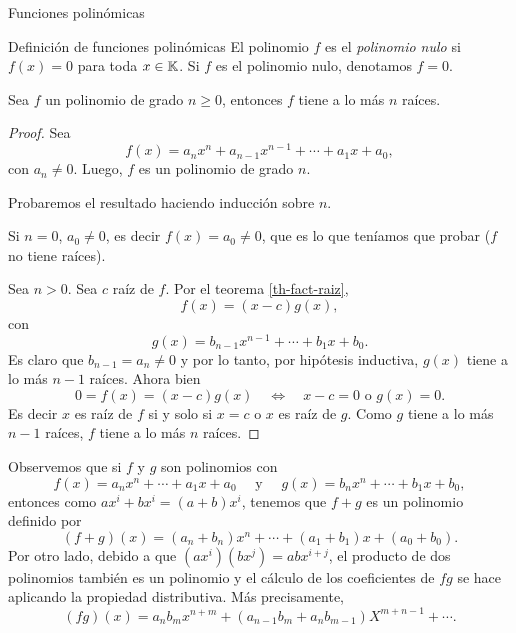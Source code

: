 \begin{chapter}{Funciones polinómicas}
\begin{section}{Definición de funciones polinómicas}
    El polinomio $f$ es el \textit{polinomio nulo} si $f(x)=0$ para toda $x \in \mathbb K$. Si $f$ es el polinomio nulo,  denotamos $f =0$.

    \begin{teorema}\label{th-pol-raiz}
        Sea $f$ un polinomio de grado $n \ge 0$, entonces $f$ tiene a lo  más  $n$ raíces.
    \end{teorema}
    \begin{proof}
        Sea
        \begin{equation*}
            f(x) = a_nx^n + a_{n-1}x^{n-1}+\cdots + a_1x +a_0,
        \end{equation*}
        con $a_n \ne 0$. Luego,  $f$ es un polinomio de grado $n$.

        Probaremos el resultado haciendo inducción sobre $n$.

        Si $n=0$, $a_0 \ne 0$, es decir  $f(x)=a_0\ne 0$, que es lo que teníamos que probar ($f$ no tiene raíces).


        Sea $n>0$. Sea $c$ raíz de $f$. Por  el teorema \ref{th-fact-raiz},
        \begin{equation*}
            f(x) = (x-c)g(x),
        \end{equation*}
        con
        \begin{equation*}
            g(x) = b_{n-1}x^{n-1} + \cdots + b_1x +b_0.
        \end{equation*}
        Es claro que $b_{n-1} = a_n \ne 0$ y por lo tanto, por hipótesis inductiva, $g(x)$ tiene a lo más $n-1$ raíces. Ahora bien
        \begin{equation*}
            0 =f(x) = (x-c)g(x) \quad \Leftrightarrow \quad x-c=0 \text{ o } g(x) =0.
        \end{equation*}
        Es decir $x$ es raíz de $f$ si y solo si $x=c$ o $x$ es raíz de $g$. Como $g$ tiene a lo más $n-1$ raíces,  $f$ tiene a lo más $n$ raíces.
    \end{proof}

    Observemos que si $f$ y $g$ son polinomios con
    \begin{equation*}
        f(x) = a_nx^n + \cdots + a_1x +a_0 \quad\text{ y } \quad g(x) = b_nx^n +\cdots + b_1x +b_0,
    \end{equation*}
    entonces como $ax^i + b x^i = (a+b)x^i$, tenemos que $f+g$ es un polinomio definido por
    \begin{equation*}
        (f + g)(x) = (a_n+b_n)x^n + \cdots + (a_1+b_1)x +(a_0+b_0).
    \end{equation*}
    Por otro  lado,  debido  a que $(ax^i)(bx^j) = abx^{i+j}$, el producto de dos polinomios también es un polinomio y el cálculo de los coeficientes de $fg$  se hace aplicando la propiedad distributiva. Más precisamente,
    \begin{equation*}
        (fg)(x) = a_nb_m x^{n+m} + (a_{n-1}b_m + a_nb_{m-1})X^{m+n-1} + \cdots.
    \end{equation*}



\end{section}
\end{chapter}
